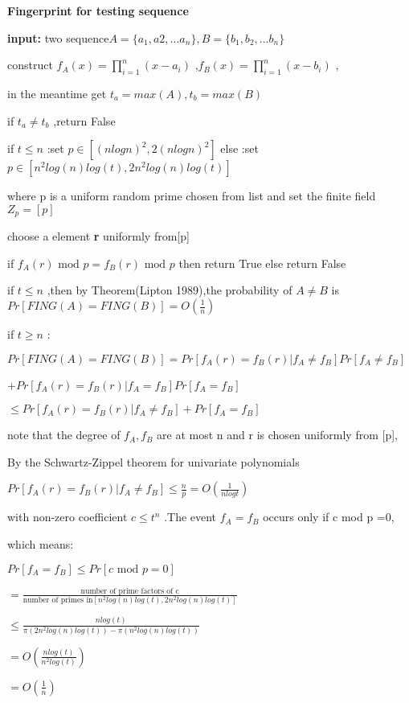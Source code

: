 \documentclass[]{article}
\begin{document}
\textbf{Fingerprint for testing sequence}


\textbf{input:} two
sequence\(A= \{a_{1},a{2},...a_{n} \},B= \{b_{1},b_{2},...b_{n} \}\)


construct \( f_{A}(x)= \prod_{i=1}^{n}(x-a_{i})\)
,\(f_{B}(x)= \prod_{i=1}^{n}(x-b_{i})\) ,

in the meantime get \(t_{a}=max(A),t_{b}=max(B)\)

if \(t_{a} \neq t_{b}\) ,return False

if \(t \leq n\) :set \(p \in [(nlogn)^{2},2(nlogn)^{2}]\) else :set
\( p\in[n^{2}log(n)log(t),2n^{2}log(n)log(t)]\)

where p is a uniform random prime chosen from list and set the finite
field \(Z_{p}=[p]\)

choose a element \textbf{r} uniformly from{[}p{]}

if \(f_{A}(r)\text{ mod } p = f_{B}(r)\text{ mod }p\) then return True
else return False


if \(t\leq n\) ,then by Theorem(Lipton 1989),the probability of
\(A \neq B\) is \( Pr[FING(A)=FING(B)]=O(\frac{1}{n})\)

if \(t \geq n\) :

\(Pr[FING(A)=FING(B)]= Pr[f_{A}(r)=f_{B}(r)|f_{A}\neq f_{B}]Pr[f_{A}\neq f_{B}]\)

+\(Pr[f_{A}(r)=f_{B}(r)|f_{A}= f_{B}]Pr[f_{A}=f_{B}]\)

\(\leq Pr[f_{A}(r)=f_{B}(r)|f_{A}\neq f_{B}]+Pr[f_{A}=f_{B}]\)

note that the degree of \(f_{A},f_{B}\) are at most n and r is chosen
uniformly from {[}p{]},

By the Schwartz-Zippel theorem for univariate polynomials

\(Pr[f_{A}(r)=f_{B}(r)|f_{A}\neq f_{B}] \leq \frac{n}{p} =O(\frac{1}{nlogt})\)

with non-zero coefficient \(c \leq t^{n}\) .The event \(f_{A}=f_{B}\)
occurs only if c mod p =0,

which means:

\(Pr[f_{A}=f_{B}]\leq Pr[c\text{ mod } p=0]\)

\(= \frac{\text{number of prime factors of c}}{\text{number of primes in}[n^{2}log(n)log(t),2n^{2}log(n)log(t)]}\)

\(\leq \frac{nlog(t)}{\pi(2n^{2}log(n)log(t))-\pi(n^{2}log(n)log(t))}\)

\(=O(\frac{nlog(t)}{n^{2}log(t)})\)

\(=O(\frac{1}{n})\)
\end{document}
